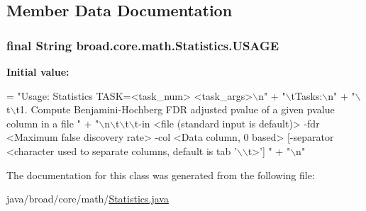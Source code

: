 \subsection{Member Data Documentation}
\hypertarget{classbroad_1_1core_1_1math_1_1_statistics_a83c7d2116f322a0e0aef5b1e76f0f00e}{
\subsubsection[{U\+S\+A\+G\+E}]{\setlength{\rightskip}{0pt plus 5cm}final String broad.\+core.\+math.\+Statistics.\+U\+S\+A\+G\+E\hspace{0.3cm}{\ttfamily [static]}}}\label{classbroad_1_1core_1_1math_1_1_statistics_a83c7d2116f322a0e0aef5b1e76f0f00e}
{\bfseries Initial value\+:}
\begin{DoxyCode}
= \textcolor{stringliteral}{"Usage: Statistics TASK=<task\_num> <task\_args>\(\backslash\)n"} +
    \textcolor{stringliteral}{"\(\backslash\)tTasks:\(\backslash\)n"} +
    \textcolor{stringliteral}{"\(\backslash\)t\(\backslash\)t1. Compute Benjamini-Hochberg FDR adjusted pvalue of a given pvalue column in a file "} +
    \textcolor{stringliteral}{"\(\backslash\)n\(\backslash\)t\(\backslash\)t\(\backslash\)t-in <file (standard input is default)> -fdr <Maximum false discovery rate> -col <Data column,
       0 based> [-separator <character used to separate columns, default is tab '\(\backslash\)\(\backslash\)t>'] "} +
    \textcolor{stringliteral}{"\(\backslash\)n"}
\end{DoxyCode}


The documentation for this class was generated from the following file\+:\begin{DoxyCompactItemize}
\item 
java/broad/core/math/\hyperlink{_statistics_8java}{Statistics.\+java}\end{DoxyCompactItemize}
